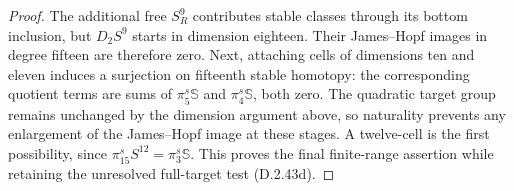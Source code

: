 \begin{proof}
The additional free $S^9_R$ contributes stable classes
through its bottom inclusion, but $D_2S^9$ starts in
dimension eighteen. Their James--Hopf images in degree
fifteen are therefore zero. Next, attaching cells of
dimensions ten and eleven induces a surjection on
fifteenth stable homotopy: the corresponding quotient
terms are sums of $\pi_5^s\mathbb S$ and
$\pi_4^s\mathbb S$, both zero. The quadratic target group
remains unchanged by the dimension argument above, so
naturality prevents any enlargement of the James--Hopf
image at these stages. A twelve-cell is the first
possibility, since $\pi_{15}^sS^{12}=\pi_3^s\mathbb S$.
This proves the final finite-range assertion while
retaining the unresolved full-target test
\textup{(D.2.43d)}.
\end{proof}
